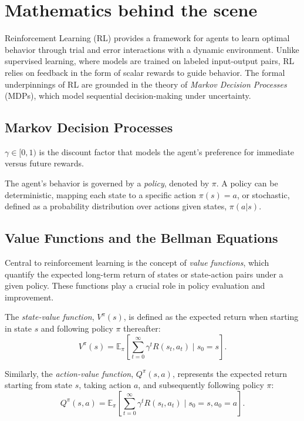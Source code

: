 \section{Mathematics behind the scene}

Reinforcement Learning (RL) provides a framework for agents to learn optimal behavior through trial and error interactions with a dynamic environment. Unlike supervised learning, where models are trained on labeled input-output pairs, RL relies on feedback in the form of scalar rewards to guide behavior. The formal underpinnings of RL are grounded in the theory of \textit{Markov Decision Processes} (MDPs), which model sequential decision-making under uncertainty.

\subsection{Markov Decision Processes}

$\gamma \in [0,1)$ is the discount factor that models the agent’s preference for immediate versus future rewards.

The agent's behavior is governed by a \textit{policy}, denoted by $\pi$. A policy can be deterministic, mapping each state to a specific action $\pi(s) = a$, or stochastic, defined as a probability distribution over actions given states, $\pi(a|s)$.

\subsection{Value Functions and the Bellman Equations}

Central to reinforcement learning is the concept of \textit{value functions}, which quantify the expected long-term return of states or state-action pairs under a given policy. These functions play a crucial role in policy evaluation and improvement.

The \textit{state-value function}, $V^\pi(s)$, is defined as the expected return when starting in state $s$ and following policy $\pi$ thereafter:
\[
V^\pi(s) = \mathbb{E}_\pi \left[ \sum_{t=0}^{\infty} \gamma^t R(s_t, a_t) \mid s_0 = s \right].
\]

Similarly, the \textit{action-value function}, $Q^\pi(s, a)$, represents the expected return starting from state $s$, taking action $a$, and subsequently following policy $\pi$:
\[
Q^\pi(s, a) = \mathbb{E}_\pi \left[ \sum_{t=0}^{\infty} \gamma^t R(s_t, a_t) \mid s_0 = s, a_0 = a \right].
\]

